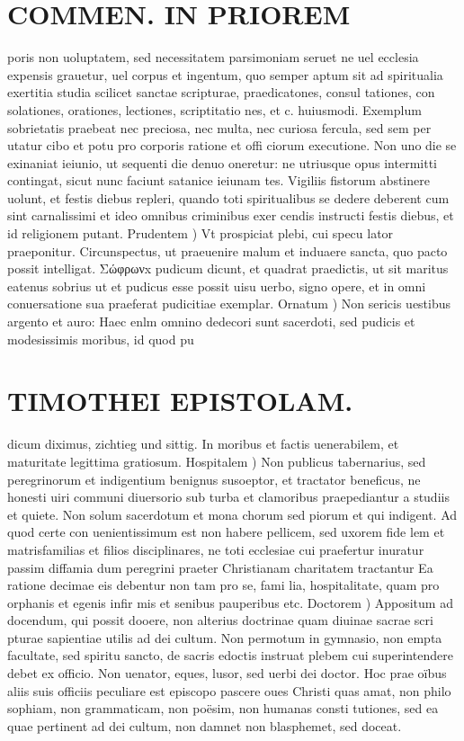 \documentclass{article}
\begin{document}
\begin{pages}
\section*{COMMEN. IN PRIOREM }
\marginpar{[ p.74 ]}\pstart poris non uoluptatem, sed necessitatem parsimoniam seruet ne uel ecclesia expensis grauetur, uel corpus et ingentum, quo semper aptum sit ad spiritualia exertitia studia scilicet sanctae scripturae, praedicatones, consul tationes, con solationes, orationes, lectiones, scriptitatio nes, et c. huiusmodi. Exemplum sobrietatis praebeat nec preciosa, nec multa, nec curiosa fercula, sed sem per utatur cibo et potu pro corporis ratione et offi ciorum executione. Non uno die se exinaniat ieiunio, ut sequenti die denuo oneretur: ne utriusque opus intermitti contingat, sicut nunc faciunt satanice ieiunam tes. Vigiliis fistorum abstinere uolunt, et festis diebus repleri, quando toti spiritualibus se dedere deberent cum sint carnalissimi et ideo omnibus criminibus exer cendis instructi festis diebus, et id religionem putant.  \pend\pstart Prudentem ) Vt prospiciat plebi, cui specu lator praeponitur. Circunspectus, ut praeuenire malum et induaere sancta, quo pacto possit intelligat. Σώφρωνx pudicum dicunt, et quadrat praedictis, ut sit maritus eatenus sobrius ut et pudicus esse possit uisu uerbo, signo opere, et in omni conuersatione sua praeferat pudicitiae exemplar.  \pend\pstart Ornatum ) Non sericis uestibus argento et auro: Haec enlm omnino dedecori sunt sacerdoti, sed pudicis et modesissimis moribus, id quod pu\pend
\section*{TIMOTHEI EPISTOLAM. }
\marginpar{[ p.75 ]}\pstart dicum diximus, zichtieg und sittig. In moribus et factis uenerabilem, et maturitate legittima gratiosum.  \pend\pstart Hospitalem ) Non publicus tabernarius, sed peregrinorum et indigentium benignus susoeptor, et tractator beneficus, ne honesti uiri communi diuersorio sub turba et clamoribus praepediantur a studiis et quiete. Non solum sacerdotum et mona chorum sed piorum et qui indigent. Ad quod certe con uenientissimum est non habere pellicem, sed uxorem fide lem et matrisfamilias et filios disciplinares, ne toti ecclesiae cui praefertur inuratur passim diffamia dum peregrini praeter Christianam charitatem tractantur Ea ratione decimae eis debentur non tam pro se, fami lia, hospitalitate, quam pro orphanis et egenis infir mis et senibus pauperibus etc.  \pend\pstart Doctorem ) Appositum ad docendum, qui possit dooere, non alterius doctrinae quam diuinae sacrae scri pturae sapientiae utilis ad dei cultum. Non permotum in gymnasio, non empta facultate, sed spiritu sancto, de sacris edoctis instruat plebem cui superintendere debet ex officio. Non uenator, eques, lusor, sed uerbi dei doctor. Hoc prae oïbus aliis suis officiis peculiare est episcopo pascere oues Christi quas amat, non philo sophiam, non grammaticam, non poësim, non humanas consti tutiones, sed ea quae pertinent ad dei cultum, non damnet non blasphemet, sed doceat.  \pend

\end{pages}
\end{document}
